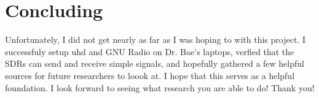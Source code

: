 \documentclass{article}
\begin{document}
\section{Concluding}
Unfortunately, I did not get nearly as far as I was hoping to with this project. I successfuly setup uhd
and GNU Radio on Dr. Bae's laptops, verfied that the SDRs can send and receive simple signals, and 
hopefully gathered a few helpful sources for future researchers to loook at. I hope that this serves
as a helpful foundation. I look forward to seeing what research you are able to do!
Thank you!
\end{document}
